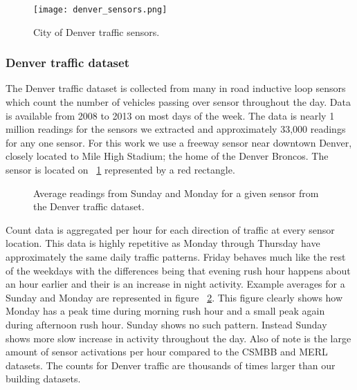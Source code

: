 \begin{figure}[!b]
	\begin{center}
		\texttt{[image: denver\_sensors.png]}
	\end{center}
	\caption{City of Denver traffic sensors.}
	\label{fig:denvertraffic}
\end{figure}

\subsubsection{Denver traffic dataset}
The Denver traffic dataset is collected from many in road inductive loop sensors which count the number of vehicles passing over sensor throughout the day.  Data is available from 2008 to 2013 on most days of the week.  The data is nearly 1 million readings for the sensors we extracted and approximately 33,000 readings for any one sensor.  For this work we use a freeway sensor near downtown Denver, closely located to Mile High Stadium; the home of the Denver Broncos.  The sensor is located on ~\ref{fig:denvertraffic} represented by a red rectangle.

\begin{figure}[t]
	\begin{center}
	\end{center}
	\caption{Average readings from Sunday and Monday for a given sensor from the Denver traffic dataset.}
	\label{fig:denver_day_raw}
\end{figure}

Count data is aggregated per hour for each direction of traffic at every sensor location.  This data is highly repetitive as Monday through Thursday have approximately the same daily traffic patterns.  Friday behaves much like the rest of the weekdays with the differences being that evening rush hour happens about an hour earlier and their is an increase in night activity.   Example averages for a Sunday and Monday are represented in figure ~\ref{fig:denver_day_raw}.  This figure clearly shows how Monday has a peak time during morning rush hour and a small peak again during afternoon rush hour.  Sunday shows no such pattern.  Instead Sunday shows more slow increase in activity throughout the day.  Also of note is the large amount of sensor activations per hour compared to the CSMBB and MERL datasets.  The counts for Denver traffic are thousands of times larger than our building datasets.

